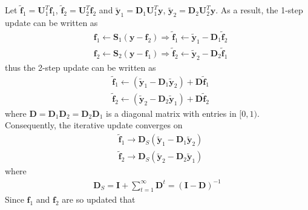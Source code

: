 \begin{exercise}
\begin{exerciseSection}
    Let $\tilde{\mathbf{f}}_1 = \mathbf{U}_1^T\mathbf{f}_1$, $\tilde{\mathbf{f}}_2 =
    \mathbf{U}_2^T\mathbf{f}_2$ and $\tilde{\mathbf{y}}_1 =
    \mathbf{D}_1\mathbf{U}_1^T\mathbf{y}$, $\tilde{\mathbf{y}}_2 =
    \mathbf{D}_2\mathbf{U}_2^T\mathbf{y}$. As a result, the 1-step update can be
    written as
    \begin{subequations}
      \begin{align}
        &\mathbf{f}_1 \leftarrow \mathbf{S}_1(\mathbf{y}-\mathbf{f}_2)
        \Longrightarrow  \tilde{\mathbf{f}}_1 \leftarrow
        \tilde{\mathbf{y}}_1- \mathbf{D}_1\tilde{\mathbf{f}}_2\\
        &\mathbf{f}_2 \leftarrow \mathbf{S}_2(\mathbf{y}-\mathbf{f}_1)
        \Longrightarrow  \tilde{\mathbf{f}}_2 \leftarrow
        \tilde{\mathbf{y}}_2- \mathbf{D}_2\tilde{\mathbf{f}}_1
      \end{align}
    \end{subequations}
    thus the 2-step update can be written as
    \begin{subequations}
      \begin{align}
        & \tilde{\mathbf{f}}_1 \leftarrow
        (\tilde{\mathbf{y}}_1-
        \mathbf{D}_1\tilde{\mathbf{y}}_2) + \mathbf{D}\tilde{\mathbf{f}}_1\\
        & \tilde{\mathbf{f}}_2 \leftarrow
        (\tilde{\mathbf{y}}_2-
        \mathbf{D}_2\tilde{\mathbf{y}}_1) + \mathbf{D}\tilde{\mathbf{f}}_2
      \end{align}
    \end{subequations} 
    where $\mathbf{D} = \mathbf{D}_1\mathbf{D}_2 = \mathbf{D}_2\mathbf{D}_1$ is
    a diagonal matrix with entries in $[0, 1)$. Consequently, the iterative
    update converges on
    \begin{subequations}
      \begin{align}
        & \tilde{\mathbf{f}}_1 \rightarrow \mathbf{D}_S (\tilde{\mathbf{y}}_1-
        \mathbf{D}_1\tilde{\mathbf{y}}_2)\\
        & \tilde{\mathbf{f}}_2 \rightarrow \mathbf{D}_S (\tilde{\mathbf{y}}_2-
        \mathbf{D}_2\tilde{\mathbf{y}}_1)
      \end{align}
    \end{subequations}
    where
    \begin{align}
      \mathbf{D}_S = \mathbf{I} + \sum_{t=1}^{\infty}\mathbf{D}^t = (\mathbf{I}
      - \mathbf{D})^{-1}
    \end{align}
    Since $\mathbf{f}_1$ and $\mathbf{f}_2$ are so updated that

\end{exerciseSection}
\end{exercise}
